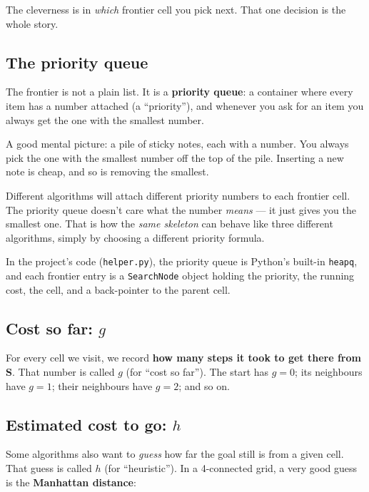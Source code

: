 \documentclass[11pt,a4paper]{article}
\begin{document}
\noindent The cleverness is in \emph{which} frontier cell you pick next. That one decision is the whole story.

\subsection{The priority queue}

The frontier is not a plain list. It is a \textbf{priority queue}: a container where every item has a number attached (a ``priority''), and whenever you ask for an item you always get the one with the smallest number.

A good mental picture: a pile of sticky notes, each with a number. You always pick the one with the smallest number off the top of the pile. Inserting a new note is cheap, and so is removing the smallest.

\begin{keybox}
Different algorithms will attach different priority numbers to each frontier cell. The priority queue doesn't care what the number \emph{means} --- it just gives you the smallest one. That is how the \emph{same skeleton} can behave like three different algorithms, simply by choosing a different priority formula.
\end{keybox}

In the project's code (\texttt{helper.py}), the priority queue is Python's built-in \texttt{heapq}, and each frontier entry is a \texttt{SearchNode} object holding the priority, the running cost, the cell, and a back-pointer to the parent cell.

\subsection{Cost so far: \texorpdfstring{$g$}{g}}

For every cell we visit, we record \textbf{how many steps it took to get there from S}. That number is called $g$ (for ``cost so far''). The start has $g=0$; its neighbours have $g=1$; their neighbours have $g=2$; and so on.

\subsection{Estimated cost to go: \texorpdfstring{$h$}{h}}

Some algorithms also want to \emph{guess} how far the goal still is from a given cell. That guess is called $h$ (for ``heuristic''). In a 4-connected grid, a very good guess is the \textbf{Manhattan distance}:
\end{document}
